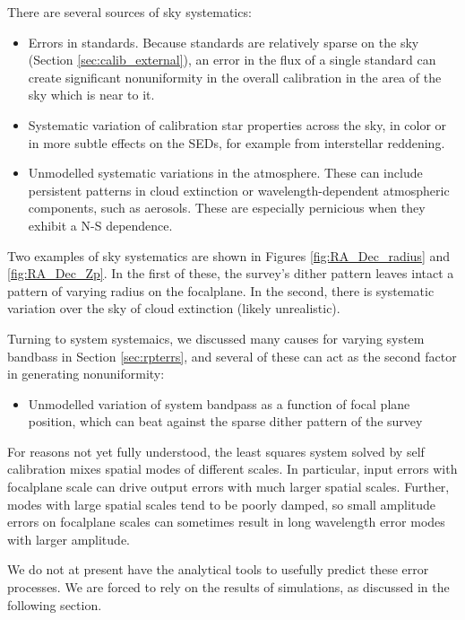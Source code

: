 \documentclass[12pt,preprint]{aastex}
\begin{document}
There are several sources of sky systematics:
\begin{itemize}
\item{Errors in standards.  Because standards are relatively sparse on the sky (Section \ref{sec:calib_external}), an error in the flux of a single standard can create significant
nonuniformity in the overall calibration in the area of the sky which is near to it.}
\item{Systematic variation of calibration star properties across the sky, in color or in more subtle effects on the SEDs, for
example from interstellar reddening.}
\item{Unmodelled systematic variations in the atmosphere. These can include persistent patterns in cloud extinction or 
wavelength-dependent atmospheric components, such as aerosols.  These are especially pernicious when they exhibit a N-S
dependence.}
\end{itemize}

Two examples of sky systematics are shown in Figures \ref{fig:RA_Dec_radius} and \ref{fig:RA_Dec_Zp}.  In the first of
these, the survey's dither pattern leaves intact a pattern of varying radius on the focalplane.   In the second, there
is systematic variation over the sky of cloud extinction (likely unrealistic).


Turning to system systemaics, we discussed many causes for varying system bandbass in Section \ref{sec:rpterrs}, and several of these can act as the second factor in generating nonuniformity:

\begin{itemize}
\item{Unmodelled variation of system bandpass as a function of focal plane position, which can beat
against the sparse dither pattern of the survey}
\end{itemize}


For reasons not yet fully understood, the least squares system solved by self calibration mixes spatial modes of 
different scales.  In particular, input errors with focalplane scale can drive output errors with much larger
spatial scales.  Further, modes with large spatial scales tend to be poorly damped, so small amplitude errors on
focalplane scales can sometimes result in long wavelength error modes with larger amplitude.

We do not at present have the analytical tools to usefully predict these error processes.  We are forced to rely
on the results of simulations, as discussed in the following section.
\end{document}
